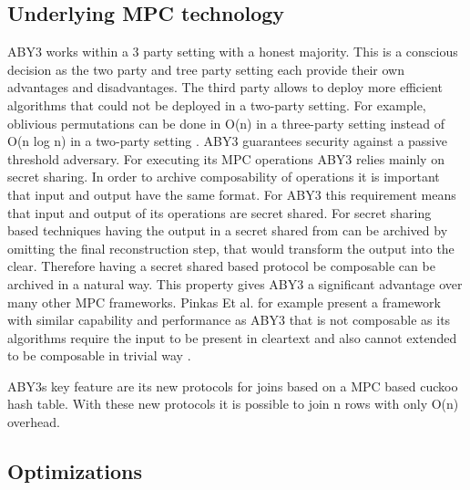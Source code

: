 \subsection{Underlying MPC technology}
ABY3 works within a 3 party setting with a honest majority. This is a conscious decision as the two party and tree party setting each provide their own advantages and disadvantages.
The third party allows to deploy more efficient algorithms that could not be deployed in a two-party setting. For example, oblivious permutations can be done in O(n) in a three-party setting instead of O(n log n) in a two-party setting \cite{aby3}.
 ABY3 guarantees security against a passive threshold adversary. For executing its MPC operations ABY3 relies mainly on secret sharing. In order to archive composability of operations it is important that input and output have the same format. For ABY3 this requirement means that input and output of its operations are secret shared. For secret sharing based techniques having the output in a secret shared from can be archived by omitting the final  reconstruction step, that would transform the output into the clear. Therefore having a secret shared based protocol be composable can be archived in a natural way. This property gives ABY3 a significant advantage over many other MPC frameworks. Pinkas Et al. \cite{pinkas2014faster} for example present a framework with similar capability and performance as ABY3 that is not composable as its algorithms require the input to be present in cleartext and also cannot extended to be composable in trivial way \cite{aby3}.      
  
 
ABY3s key feature are its new protocols for joins based on a MPC based cuckoo hash table. With these new protocols it is possible to join n rows with only O(n) overhead.


\subsection{Optimizations}
